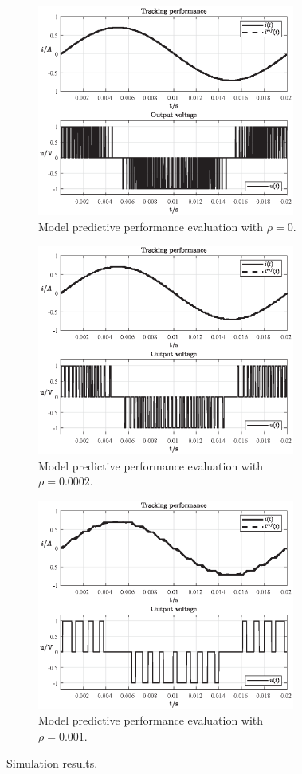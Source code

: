 \documentclass[11pt,a4paper,oneside]{book}
\numberwithin{equation}{section}
\theoremstyle{it}
\theoremstyle{definition}
\begin{document}
\begin{figure}[H]
	\centering
	\begin{subfigure}{.5\textwidth}
		\centering
		\includegraphics[width = 240pt, 
		keepaspectratio]{figures/mpc/mpc_rho0.eps}
		\captionsetup{width=.5\textwidth}
		\caption{Model predictive performance evaluation with $\rho=0$.}
		\label{fig:current_ctrl1}
	\end{subfigure}%
	\begin{subfigure}{.5\textwidth}
		\centering
		\includegraphics[width = 240pt, 
		keepaspectratio]{figures/mpc/mpc_rho.eps}
		\captionsetup{width=.5\textwidth}
		\caption{Model predictive performance evaluation with $\rho=0.0002$.}
		\label{fig:current_ctrl2}
	\end{subfigure}
	\begin{subfigure}{.5\textwidth}
		\centering
		\includegraphics[width = 240pt, 
		keepaspectratio]{figures/mpc/mpc_rhoh.eps}
		\captionsetup{width=.5\textwidth}
		\caption{Model predictive performance evaluation with $\rho=0.001$.}
		\label{fig:current_ctrl3}
	\end{subfigure}
	\caption{Simulation results.}
	\label{}
\end{figure}
\end{document}
